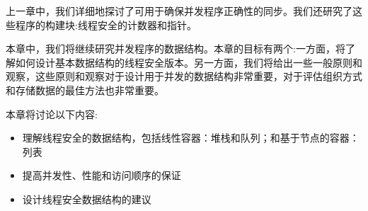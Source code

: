 上一章中，我们详细地探讨了可用于确保并发程序正确性的同步。我们还研究了这些程序的构建块:线程安全的计数器和指针。

本章中，我们将继续研究并发程序的数据结构。本章的目标有两个:一方面，将了解如何设计基本数据结构的线程安全版本。另一方面，我们将给出一些一般原则和观察，这些原则和观察对于设计用于并发的数据结构非常重要，对于评估组织方式和存储数据的最佳方法也非常重要。

本章将讨论以下内容:

\begin{itemize}
\item
理解线程安全的数据结构，包括线性容器：堆栈和队列；和基于节点的容器：列表

\item
提高并发性、性能和访问顺序的保证

\item
设计线程安全数据结构的建议

\end{itemize}















